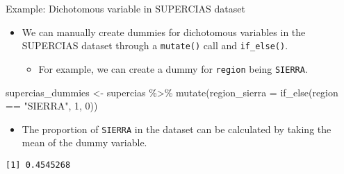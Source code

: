 \documentclass[
  10pt,
  ignorenonframetext,
]{beamer}
\newenvironment{Shaded}{\begin{snugshade}}{\end{snugshade}}
\newcommand{\AttributeTok}[1]{\textcolor[rgb]{0.40,0.45,0.13}{#1}}
\newcommand{\DecValTok}[1]{\textcolor[rgb]{0.68,0.00,0.00}{#1}}
\newcommand{\FunctionTok}[1]{\textcolor[rgb]{0.28,0.35,0.67}{#1}}
\newcommand{\NormalTok}[1]{\textcolor[rgb]{0.00,0.23,0.31}{#1}}
\newcommand{\OtherTok}[1]{\textcolor[rgb]{0.00,0.23,0.31}{#1}}
\newcommand{\SpecialCharTok}[1]{\textcolor[rgb]{0.37,0.37,0.37}{#1}}
\newcommand{\StringTok}[1]{\textcolor[rgb]{0.13,0.47,0.30}{#1}}
\providecommand{\tightlist}{%
  \setlength{\itemsep}{0pt}\setlength{\parskip}{0pt}}\usepackage{longtable,booktabs,array}
\begin{document}
\begin{frame}[fragile]{Example: Dichotomous variable in SUPERCIAS
dataset}
\label{example-dichotomous-variable-in-supercias-dataset}
\begin{itemize}
\tightlist
\item
  We can manually create dummies for dichotomous variables in the
  SUPERCIAS dataset through a \texttt{mutate()} call and
  \texttt{if\_else()}.

  \begin{itemize}
  \tightlist
  \item
    For example, we can create a dummy for \texttt{region} being
    \texttt{SIERRA}.
  \end{itemize}
\end{itemize}

\begin{Shaded}
\begin{Highlighting}[]
\NormalTok{supercias\_dummies }\OtherTok{\textless{}{-}} 
\NormalTok{    supercias }\SpecialCharTok{\%\textgreater{}\%} 
    \FunctionTok{mutate}\NormalTok{(}\AttributeTok{region\_sierra =} \FunctionTok{if\_else}\NormalTok{(region }\SpecialCharTok{==} \StringTok{"SIERRA"}\NormalTok{, }\DecValTok{1}\NormalTok{, }\DecValTok{0}\NormalTok{))}
\end{Highlighting}
\end{Shaded}

\begin{itemize}
\tightlist
\item
  The proportion of \texttt{SIERRA} in the dataset can be calculated by
  taking the mean of the dummy variable.
\end{itemize}

\begin{Shaded}
\end{Shaded}

\begin{verbatim}
[1] 0.4545268
\end{verbatim}
\end{frame}
\end{document}
